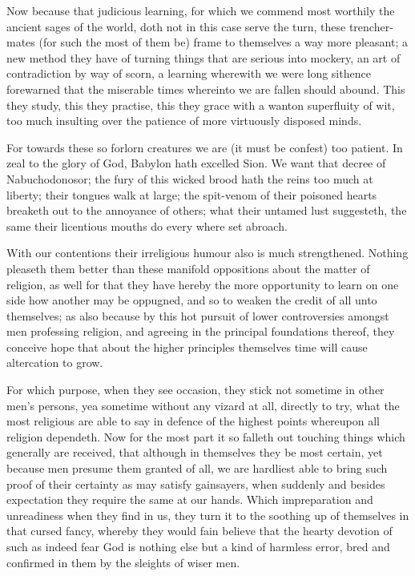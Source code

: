 Now because that judicious learning, for which we commend most worthily the ancient sages of the world, doth not in this case serve the turn, these trencher-mates (for such the most of them be) frame to themselves a way more pleasant; a new method they have of turning things that are serious into mockery, an art of contradiction by way of scorn, a learning wherewith we were long sithence forewarned that the miserable times whereinto we are fallen should abound. This they study, this they practise, this they grace with a wanton superfluity of wit, too much insulting over the patience of more virtuously disposed minds.

For towards these so forlorn creatures we are (it must be confest) too patient. In zeal to the glory of God, Babylon hath excelled Sion. We want that decree of Nabuchodonosor;  the fury of this wicked brood hath the reins too much at liberty;
 their tongues walk at large; the spit-venom of their poisoned hearts breaketh out to the annoyance of others; what their untamed lust suggesteth, the same their licentious mouths do every where set abroach.

With our contentions their irreligious humour also is much strengthened. Nothing pleaseth them better than these manifold oppositions about the matter of religion, as well for that they have hereby the more opportunity to learn on one side how another may be oppugned, and so to weaken the credit of all unto themselves; as also because by this hot pursuit of lower controversies amongst men professing religion, and agreeing in the principal foundations thereof, they conceive hope that about the higher principles themselves time will cause altercation to grow.

For which purpose, when they see occasion, they stick not sometime in other men’s persons, yea sometime without any vizard at all, directly to try, what the most religious are able to say in defence of the highest points whereupon all religion dependeth. Now for the most part it so falleth out touching things which generally are received, that although in themselves they be most certain, yet because men presume them granted of all, we are hardliest able to bring such proof of their certainty as may satisfy gainsayers, when suddenly and besides expectation they require the same at our hands. Which impreparation and unreadiness when they find in us, they turn it to the soothing up of themselves in that cursed fancy, whereby they would fain believe that the hearty devotion of such as indeed fear God is nothing else but a kind of harmless error, bred and confirmed in them by the sleights of wiser men.

